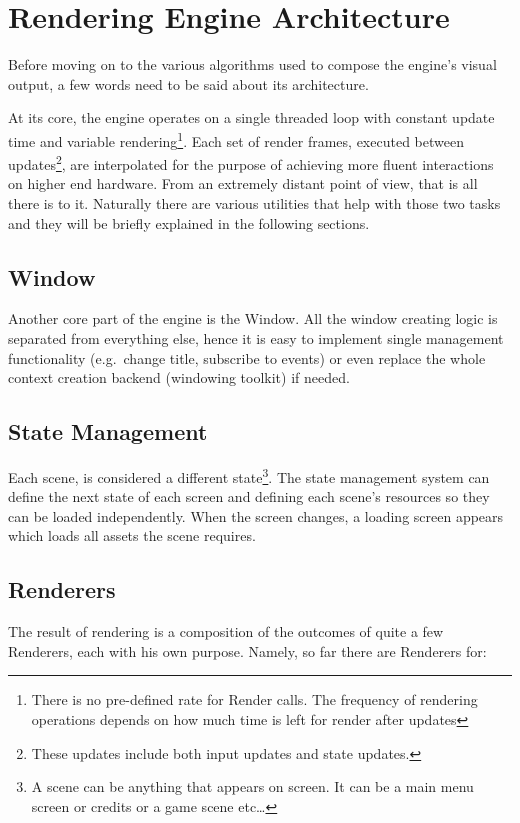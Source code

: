 \section{Rendering Engine Architecture}
Before moving on to the various algorithms used to compose the engine's visual output, a few
words need to be said about its architecture.

At its core, the engine operates on a single threaded loop with constant update time and
variable rendering\footnote{There is no pre-defined rate for Render calls. The frequency of
rendering operations depends on how much time is left for render after updates}.
Each set of render frames, executed between updates\footnote{These updates include both input
updates and state updates.}, are interpolated for the purpose of achieving more fluent interactions
on higher end hardware. From an extremely distant point of view, that is all there is to it.
Naturally there are various utilities that help with those two tasks and they will be briefly
explained in the following sections.

\subsection{Window}
Another core part of the engine is the Window. All the window creating logic
is separated from everything else, hence it is easy to implement single management functionality
(e.g.\ change title, subscribe to events) or even replace the whole context creation backend
(windowing toolkit) if needed.

\subsection{State Management}
Each scene, is considered a different state\footnote{A scene can be anything that appears on
screen. It can be a main menu screen or credits or a game scene etc\dots}. The state management
system can define the next state of each screen and defining each scene's resources
so they can be loaded independently. When the screen changes, a loading screen appears which loads
all assets the scene requires.

\subsection{Renderers}
The result of rendering is a composition of the outcomes of quite a few Renderers, each
with his own purpose. Namely, so far there are Renderers for:

